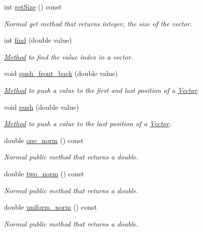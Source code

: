 \begin{DoxyCompactItemize}
int \hyperlink{classVector_ad7a31bddb977b9fee5fd6226d77ca119}{get\+Size} () const 
\begin{DoxyCompactList}\small\item\em Normal get method that returns integer, the size of the vector. \end{DoxyCompactList}\item 
int \hyperlink{classVector_aa3039634ae7c98a3d46c351639c9b5ba}{find} (double value)
\begin{DoxyCompactList}\small\item\em \hyperlink{classMethod}{Method} to find the value index in a vector. \end{DoxyCompactList}\item 
void \hyperlink{classVector_a2c5afe0bb139bceda6723c22eb52a1cc}{push\+\_\+front\+\_\+back} (double value)
\begin{DoxyCompactList}\small\item\em \hyperlink{classMethod}{Method} to push a value to the first and last position of a \hyperlink{classVector}{Vector}. \end{DoxyCompactList}\item 
void \hyperlink{classVector_a762d62609d78fc2c59fc01774e806b3a}{push} (double value)
\begin{DoxyCompactList}\small\item\em \hyperlink{classMethod}{Method} to push a value to the last position of a \hyperlink{classVector}{Vector}. \end{DoxyCompactList}\item 
double \hyperlink{classVector_a6d840e97c65aa82bdedd2e09593e6fb5}{one\+\_\+norm} () const 
\begin{DoxyCompactList}\small\item\em Normal public method that returns a double. \end{DoxyCompactList}\item 
double \hyperlink{classVector_a251aae1e7686d923e4dad4679e37e997}{two\+\_\+norm} () const 
\begin{DoxyCompactList}\small\item\em Normal public method that returns a double. \end{DoxyCompactList}\item 
double \hyperlink{classVector_a72726780286e047ea7fdc1bc48bc8d7f}{uniform\+\_\+norm} () const 
\begin{DoxyCompactList}\small\item\em Normal public method that returns a double. \end{DoxyCompactList}\end{DoxyCompactItemize}
